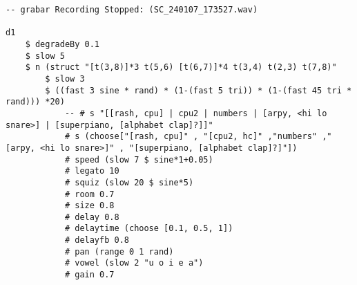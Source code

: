 \begin{minipage}[t]{1\textwidth}
    \centering
    \begin{lstlisting}[style=SuperCollider-IDE, language=ExtendedHaskell, basicstyle=\footnotesize\ttfamily, numbers=none]
-- grabar Recording Stopped: (SC_240107_173527.wav)

d1 
    $ degradeBy 0.1
    $ slow 5 
    $ n (struct "[t(3,8)]*3 t(5,6) [t(6,7)]*4 t(3,4) t(2,3) t(7,8)"
        $ slow 3 
        $ ((fast 3 sine * rand) * (1-(fast 5 tri)) * (1-(fast 45 tri * rand))) *20) 
            -- # s "[[rash, cpu] | cpu2 | numbers | [arpy, <hi lo snare>] | [superpiano, [alphabet clap]?]]" 
            # s (choose["[rash, cpu]" , "[cpu2, hc]" ,"numbers" ," [arpy, <hi lo snare>]" , "[superpiano, [alphabet clap]?]"])
            # speed (slow 7 $ sine*1+0.05) 
            # legato 10
            # squiz (slow 20 $ sine*5)
            # room 0.7
            # size 0.8
            # delay 0.8
            # delaytime (choose [0.1, 0.5, 1])
            # delayfb 0.8
            # pan (range 0 1 rand)
            # vowel (slow 2 "u o i e a")
            # gain 0.7               
    \end{lstlisting}
    \vspace{1cm}
\end{minipage}